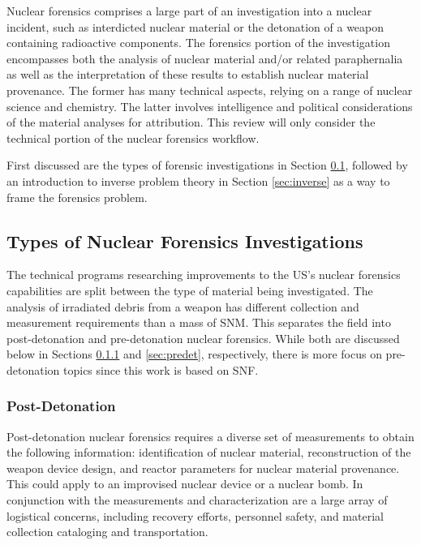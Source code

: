 Nuclear forensics comprises a large part of an investigation into a nuclear
incident, such as interdicted nuclear material or the detonation of a weapon
containing radioactive components.  The forensics portion of the investigation
encompasses both the analysis of nuclear material and/or related paraphernalia
as well as the interpretation of these results to establish nuclear material
provenance. The former has many technical aspects, relying on a range of
nuclear science and chemistry.  The latter involves intelligence and political
considerations of the material analyses for attribution. This review will only
consider the technical portion of the nuclear forensics workflow.

First discussed are the types of forensic investigations in Section
\ref{sec:types}, followed by an introduction to inverse problem theory in
Section \ref{sec:inverse} as a way to frame the forensics problem.

\subsection{Types of Nuclear Forensics Investigations}
\label{sec:types}

The technical programs researching improvements to the \acrshort{US}'s nuclear
forensics capabilities are split between the type of material being
investigated. The analysis of irradiated debris from a weapon has different
collection and measurement requirements than a mass of \gls{SNM}. This
separates the field into post-detonation and pre-detonation nuclear forensics.
While both are discussed below in Sections \ref{sec:postdet} and
\ref{sec:predet}, respectively, there is more focus on pre-detonation topics
since this work is based on \gls{SNF}. 

\subsubsection{Post-Detonation}
\label{sec:postdet}

Post-detonation nuclear forensics requires a diverse set of measurements to
obtain the following information: identification of nuclear material,
reconstruction of the weapon device design, and reactor parameters for nuclear
material provenance. This could apply to an improvised nuclear device or a
nuclear bomb.  In conjunction with the measurements and characterization are a
large array of logistical concerns, including recovery efforts, personnel
safety, and material collection cataloging and transportation.

